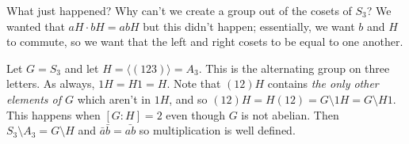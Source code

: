 What just happened? Why can't we create a group out of the cosets of $S_3$? We wanted that $aH \cdot bH = abH$ but this didn't happen; essentially, we want $b$ and $H$ to commute, so we want that the left and right cosets to be equal to one another.

\begin{example}
Let $G = S_3$ and let $H = \langle (123) \rangle = A_3$. This is the alternating group on three letters. As always, $1H = H1 = H$. Note that $(12)H$ contains \emph{the only other elements of $G$} which aren't in $1H$, and so $(12)H = H(12) = G \setminus 1H = G \setminus H1$. This happens when $[G : H] = 2$ even though $G$ is not abelian. Then $S_3 \setminus A_3 = G \setminus H$ and $\bar{a}\bar{b} = \bar{ab}$ so multiplication is well defined.
\end{example}

